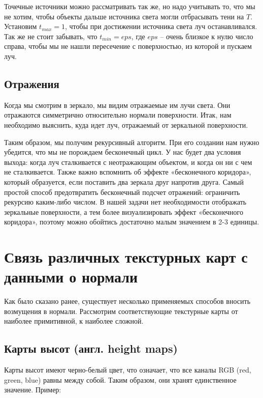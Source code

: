 Точечные источники можно рассматривать так же, но надо учитывать то, что мы не хотим, чтобы объекты дальше источника света могли отбрасывать тени на $T$. Установим $t_{max} = 1$, чтобы при достижении источника света луч останавливался. Так же не стоит забывать, что $t_{min} = eps$, где $eps$ – очень близкое к нулю число справа, чтобы мы не нашли пересечение с поверхностью, из которой и пускаем луч.

\subsection{Отражения}

Когда мы смотрим в зеркало, мы видим отражаемые им лучи света. Они отражаются симметрично относительно нормали поверхности. Итак, нам необходимо выяснить, куда идет луч, отражаемый от зеркальной поверхности.

Таким образом, мы получим рекурсивный алгоритм. При его создании нам нужно убедится, что мы не порождаем бесконечный цикл. У нас будет два условия выхода: когда луч сталкивается с неотражающим объектом, и когда он ни с чем не сталкивается. Также важно вспомнить об эффекте «бесконечного коридора», который образуется, если поставить два зеркала друг напротив друга. Самый простой способ предотвратить бесконечный подсчет отражений: ограничить рекурсию каким-либо числом. В нашей задачи нет необходимости отображать зеркальные поверхности, а тем более визуализировать эффект «бесконечного коридора», поэтому можно обойтись достаточно малым значением в 2-3 единицы.

\section{Связь различных текстурных карт с данными о нормали}

Как было сказано ранее, существует несколько применяемых способов
вносить возмущения в нормали. Рассмотрим соответствующие текстурные
карты от наиболее примитивной, к наиболее сложной.

\subsection{Карты высот (англ. height maps)}

Карты высот имеют черно-белый цвет, что означает, что все каналы RGB (red, green, blue) равны между собой. Таким образом, они хранят единственное значение. Пример:

